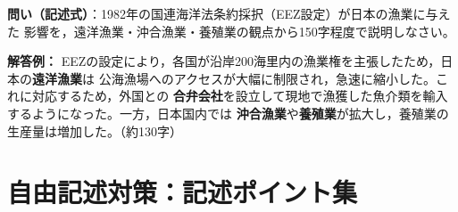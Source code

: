 \documentclass[a4paper,11pt]{article}
\newcommand{\imp}[1]{\textbf{\textcolor{mainred}{#1}}}
\begin{document}
\vspace{3mm}

\begin{tcolorbox}[testbox, title={〔共通テスト類題④〕EEZ設定による日本漁業の変化}]
\textbf{問い（記述式）}：1982年の国連海洋法条約採択（EEZ設定）が日本の漁業に与えた
影響を，遠洋漁業・沖合漁業・養殖業の観点から150字程度で説明しなさい。

\medskip
\textbf{解答例：}
EEZの設定により，各国が沿岸200海里内の漁業権を主張したため，日本の\imp{遠洋漁業}は
公海漁場へのアクセスが大幅に制限され，急速に縮小した。これに対応するため，外国との
\imp{合弁会社}を設立して現地で漁獲した魚介類を輸入するようになった。一方，日本国内では
\imp{沖合漁業}や\imp{養殖業}が拡大し，養殖業の生産量は増加した。（約130字）
\end{tcolorbox}

\vspace{2mm}

\section{自由記述対策：記述ポイント集}
\end{document}
